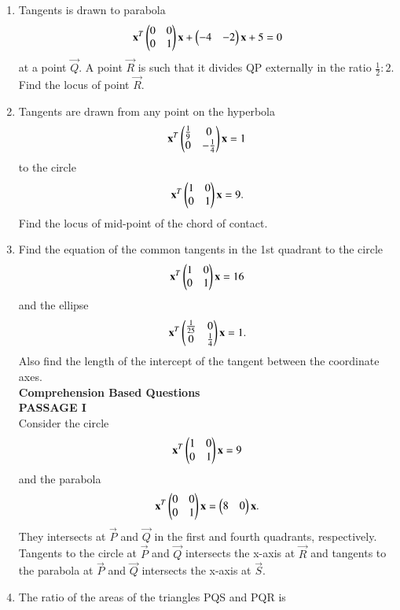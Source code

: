 \documentclass[journal,12pt,twocolumn]{IEEEtran}
\begin{document}
\begin{enumerate}[label=\arabic*]
    \item Tangents is drawn to parabola
    \begin{align}
    \mathbf{x}^T\begin{pmatrix}0&0\\0&1\end{pmatrix}\mathbf{x}+\begin{pmatrix}-4&-2\end{pmatrix}\mathbf{x}+5=0
    \end{align} at a point $\vec{Q}$. A point $\vec{R}$ is such that it divides QP externally in the ratio $\frac{1}{2}:2$. Find the locus of point $\vec{R}$.
    \item Tangents are drawn from any point on the hyperbola
    \begin{align}
    \mathbf{x}^T\begin{pmatrix}\frac{1}{9}&0\\0&-\frac{1}{4}\end{pmatrix}\mathbf{x}=1
    \end{align} to the circle
    \begin{align}
    \mathbf{x}^T\begin{pmatrix}1&0\\0&1\end{pmatrix}\mathbf{x}=9.
    \end{align} Find the locus of mid-point of the chord of contact.
    \item Find the equation of the common tangents in the 1st quadrant to the circle 
    \begin{align}
    \mathbf{x}^T\begin{pmatrix}1&0\\0&1\end{pmatrix}\mathbf{x}=16
    \end{align} and the ellipse
    \begin{align}
    \mathbf{x}^T\begin{pmatrix}\frac{1}{25}&0\\0&\frac{1}{4}\end{pmatrix}\mathbf{x}=1.
    \end{align} Also find the length of the intercept of the tangent between the coordinate axes.\\
    {\Large\textbf{Comprehension Based Questions}}\\
    \textbf{PASSAGE I}\\
    Consider the circle
    \begin{align}
    \mathbf{x}^T\begin{pmatrix}1&0\\0&1\end{pmatrix}\mathbf{x}=9
    \end{align} and the parabola
    \begin{align}
    \mathbf{x}^T\begin{pmatrix}0&0\\0&1\end{pmatrix}\mathbf{x}=\begin{pmatrix}8&0\end{pmatrix}\mathbf{x}.
    \end{align} They intersects at $\vec{P}$ and $\vec{Q}$ in the first and fourth quadrants, 				respectively. Tangents to the circle at $\vec{P}$ and $\vec{Q}$ intersects the x-axis at 
    $\vec{R}$ and tangents to the parabola at $\vec{P}$ and $\vec{Q}$ intersects the x-axis at 
    $\vec{S}$.
    \item The ratio of the areas of the triangles PQS and PQR is 

\end{enumerate}
\end{document}
